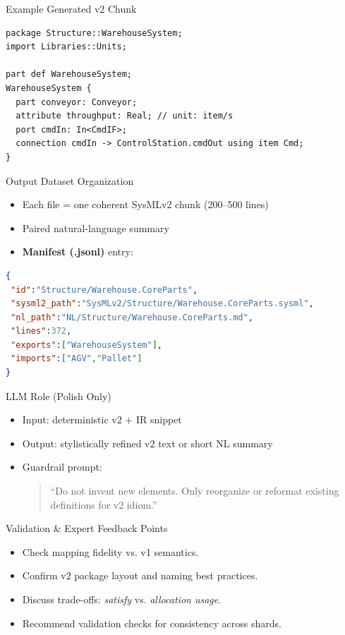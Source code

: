 \documentclass[aspectratio=169]{beamer}
\begin{document}
\begin{frame}[fragile]{Example Generated v2 Chunk}
\small
\begin{lstlisting}[style=code]
package Structure::WarehouseSystem;
import Libraries::Units;

part def WarehouseSystem;
WarehouseSystem {
  part conveyor: Conveyor;
  attribute throughput: Real; // unit: item/s
  port cmdIn: In<CmdIF>;
  connection cmdIn -> ControlStation.cmdOut using item Cmd;
}
\end{lstlisting}
\normalsize
\end{frame}

\begin{frame}[fragile]{Output Dataset Organization}
\begin{itemize}
  \item Each file = one coherent SysMLv2 chunk (200--500 lines)
  \item Paired natural-language summary
  \item \textbf{Manifest (.jsonl)} entry:
\end{itemize}

\small
\begin{lstlisting}[style=code,language=json]
{
 "id":"Structure/Warehouse.CoreParts",
 "sysml2_path":"SysMLv2/Structure/Warehouse.CoreParts.sysml",
 "nl_path":"NL/Structure/Warehouse.CoreParts.md",
 "lines":372,
 "exports":["WarehouseSystem"],
 "imports":["AGV","Pallet"]
}
\end{lstlisting}
\normalsize
\end{frame}

\begin{frame}{LLM Role (Polish Only)}
\begin{itemize}
  \item Input: deterministic v2 + IR snippet
  \item Output: stylistically refined v2 text or short NL summary
  \item Guardrail prompt:
  \begin{quote}
  ``Do not invent new elements. Only reorganize or reformat existing definitions for v2 idiom.''
  \end{quote}
\end{itemize}
\end{frame}

\begin{frame}{Validation \& Expert Feedback Points}
\begin{itemize}
  \item Check mapping fidelity vs. v1 semantics.
  \item Confirm v2 package layout and naming best practices.
  \item Discuss trade-offs: \emph{satisfy} vs. \emph{allocation usage}.
  \item Recommend validation checks for consistency across shards.
\end{itemize}
\end{frame}
\end{document}
